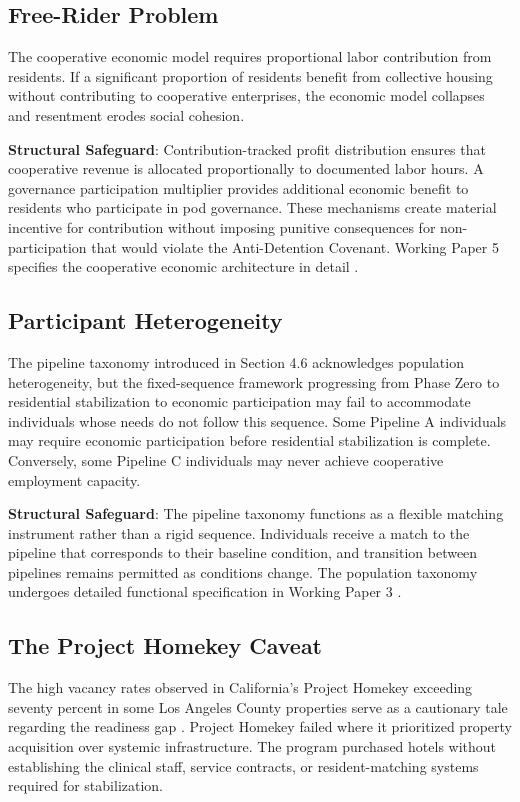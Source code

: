 \documentclass[12pt, letterpaper]{article}
\begin{document}
\subsection{Free-Rider Problem}

The cooperative economic model requires proportional labor contribution from residents. If a significant proportion of residents benefit from collective housing without contributing to cooperative enterprises, the economic model collapses and resentment erodes social cohesion.

\textbf{Structural Safeguard}: Contribution-tracked profit distribution ensures that cooperative revenue is allocated proportionally to documented labor hours. A governance participation multiplier provides additional economic benefit to residents who participate in pod governance. These mechanisms create material incentive for contribution without imposing punitive consequences for non-participation that would violate the Anti-Detention Covenant. Working Paper 5 specifies the cooperative economic architecture in detail \citep{dibella_2026_wp5}.

\subsection{Participant Heterogeneity}

The pipeline taxonomy introduced in Section 4.6 acknowledges population heterogeneity, but the fixed-sequence framework progressing from Phase Zero to residential stabilization to economic participation may fail to accommodate individuals whose needs do not follow this sequence. Some Pipeline A individuals may require economic participation before residential stabilization is complete. Conversely, some Pipeline C individuals may never achieve cooperative employment capacity.

\textbf{Structural Safeguard}: The pipeline taxonomy functions as a flexible matching instrument rather than a rigid sequence. Individuals receive a match to the pipeline that corresponds to their baseline condition, and transition between pipelines remains permitted as conditions change. The population taxonomy undergoes detailed functional specification in Working Paper 3 \citep{dibella_2026_wp3}.

\subsection{The Project Homekey Caveat}

The high vacancy rates observed in California's Project Homekey exceeding seventy percent in some Los Angeles County properties serve as a cautionary tale regarding the readiness gap \citep{pacific_research_2024}. Project Homekey failed where it prioritized property acquisition over systemic infrastructure. The program purchased hotels without establishing the clinical staff, service contracts, or resident-matching systems required for stabilization.
\end{document}

